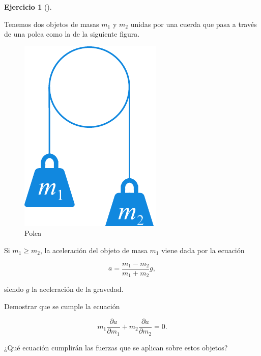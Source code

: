 \documentclass[
  a4paper,
]{scrreport}
\theoremstyle{definition}
\newtheorem{exercise}{Ejercicio}[chapter]
\theoremstyle{remark}
\begin{document}
\begin{exercise}[]\protect\hypertarget{exr-polea}{}\label{exr-polea}

Tenemos dos objetos de masas \(m_1\) y \(m_2\) unidas por una cuerda que
pasa a través de una polea como la de la siguiente figura.

\begin{figure}

{\centering \includegraphics{img/derivadas-funciones-varias-variables/polea.pdf}

}

\caption{Polea}

\end{figure}

Si \(m_1\geq m_2\), la aceleración del objeto de masa \(m_1\) viene dada
por la ecuación

\[
a=\frac{m_1-m_2}{m_1+m_2}g,
\]

siendo \(g\) la aceleración de la gravedad.

Demostrar que se cumple la ecuación

\[
m_1\frac{\partial a}{\partial m_1}+m_2\frac{\partial a}{\partial m_2}=0.
\]

¿Qué ecuación cumplirán las fuerzas que se aplican sobre estos objetos?

\end{exercise}
\end{document}
